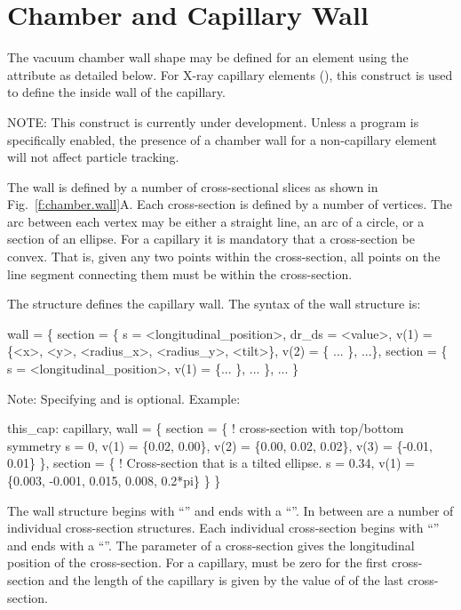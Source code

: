 \section{Chamber and Capillary Wall}
\label{s:wall}

The vacuum chamber wall shape may be defined for an element using the
 attribute as detailed below. For X-ray capillary elements
(), this construct is used to define the inside wall
of the capillary.

NOTE: This construct is currently under development. Unless a program
is specifically enabled, the presence of a chamber wall for a
non-capillary element will not affect particle tracking.

The wall is defined by a number of cross-sectional slices as shown in
Fig.~\ref{f:chamber.wall}A. Each cross-section is defined by a number of
vertices. The arc between each vertex may be either a straight line,
an arc of a circle, or a section of an ellipse. For a capillary it is
mandatory that a cross-section be convex. That is, given any two
points within the cross-section, all points on the line segment
connecting them must be within the cross-section.

The  structure defines the capillary wall. The
syntax of the wall structure is:
\begin{example}
  wall = \{
    section = \{ 
      s = <longitudinal_position>, 
      dr_ds = <value>,
      v(1) = \{<x>, <y>, <radius_x>, <radius_y>, <tilt>\}, 
      v(2) = \{ ... \},
      ...\},
    section = \{
      s = <longitudinal_position>, 
      v(1) = \{... \},
      ... \},
    ... \}
\end{example}
Note: Specifying  and  is optional.
Example:
\begin{example}
  this_cap: capillary, 
    wall = \{   
      section = \{ ! cross-section with top/bottom symmetry
        s = 0, v(1) =  \{0.02, 0.00\}, 
        v(2) = \{0.00, 0.02, 0.02\}, v(3) = \{-0.01, 0.01\} \}, 
      section = \{  ! Cross-section that is a tilted ellipse.
        s = 0.34, 
        v(1) = \{0.003, -0.001, 0.015, 0.008, 0.2*pi\} \} \}
\end{example}

The wall structure begins with ``'' and ends with a
``\vn{\}}''. In between are a number of individual cross-section
structures.  Each individual cross-section begins with ``'' and ends with a ``\vn{\}}''. The  parameter of a
cross-section gives the longitudinal position of the cross-section.
For a capillary,  must be zero for the first cross-section and
the length of the capillary is given by the value of  of the
last cross-section.

